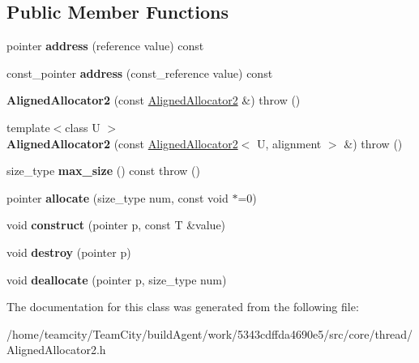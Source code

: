 \subsection*{Public Member Functions}
\begin{DoxyCompactItemize}
\item 
pointer {\bfseries address} (reference value) const \hypertarget{classAlignedAllocator2_aa8c6c6d9675b6c5132f4039e45335fcd}{}\label{classAlignedAllocator2_aa8c6c6d9675b6c5132f4039e45335fcd}

\item 
const\+\_\+pointer {\bfseries address} (const\+\_\+reference value) const \hypertarget{classAlignedAllocator2_af26b687ed65dd994fa650fbffed38189}{}\label{classAlignedAllocator2_af26b687ed65dd994fa650fbffed38189}

\item 
{\bfseries Aligned\+Allocator2} (const \hyperlink{classAlignedAllocator2}{Aligned\+Allocator2} \&)  throw ()\hypertarget{classAlignedAllocator2_a055b6aee6d67fa9ef19b945831af6ba2}{}\label{classAlignedAllocator2_a055b6aee6d67fa9ef19b945831af6ba2}

\item 
{\footnotesize template$<$class U $>$ }\\{\bfseries Aligned\+Allocator2} (const \hyperlink{classAlignedAllocator2}{Aligned\+Allocator2}$<$ U, alignment $>$ \&)  throw ()\hypertarget{classAlignedAllocator2_a9baed24dface5d93594192f80011a22b}{}\label{classAlignedAllocator2_a9baed24dface5d93594192f80011a22b}

\item 
size\+\_\+type {\bfseries max\+\_\+size} () const   throw ()\hypertarget{classAlignedAllocator2_a62217df2c44663d5013e411d8b284905}{}\label{classAlignedAllocator2_a62217df2c44663d5013e411d8b284905}

\item 
pointer {\bfseries allocate} (size\+\_\+type num, const void $\ast$=0)\hypertarget{classAlignedAllocator2_a50ebd094568307b1d334c051a6c4452e}{}\label{classAlignedAllocator2_a50ebd094568307b1d334c051a6c4452e}

\item 
void {\bfseries construct} (pointer p, const T \&value)\hypertarget{classAlignedAllocator2_a53dbcd7925c1b6d9f5a77021aca6d90b}{}\label{classAlignedAllocator2_a53dbcd7925c1b6d9f5a77021aca6d90b}

\item 
void {\bfseries destroy} (pointer p)\hypertarget{classAlignedAllocator2_af1923df8d69d43050a6a98ec1994ee58}{}\label{classAlignedAllocator2_af1923df8d69d43050a6a98ec1994ee58}

\item 
void {\bfseries deallocate} (pointer p, size\+\_\+type num)\hypertarget{classAlignedAllocator2_ac1e8dd1ef4fbd9f2ddb182bbac864e49}{}\label{classAlignedAllocator2_ac1e8dd1ef4fbd9f2ddb182bbac864e49}

\end{DoxyCompactItemize}


The documentation for this class was generated from the following file\+:\begin{DoxyCompactItemize}
\item 
/home/teamcity/\+Team\+City/build\+Agent/work/5343cdffda4690e5/src/core/thread/Aligned\+Allocator2.\+h\end{DoxyCompactItemize}

